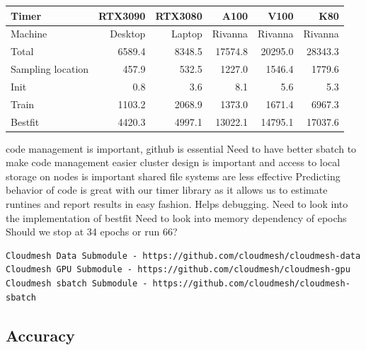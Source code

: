 \documentclass[utf8]{FrontiersinVancouver} %
\newcommand{\TODO}[1]{\todo[inline]{#1}}
\begin{document}
  \begin{table}[htb]
    \caption{Runtime of the 2 epoch case in seconds}
    {\footnotesize              
      \begin{center}
        \begin{table}[]
          \begin{tabular}{lrrrrr}
            Timer             & RTX3090 & RTX3080 & A100    & V100    & K80     \\
            \hline
            Machine           & Desktop & Laptop  & Rivanna & Rivanna & Rivanna \\
            Total             & 6589.4  & 8348.5  & 17574.8 & 20295.0 & 28343.3 \\
            Sampling location &  457.9  &  532.5  &  1227.0 &  1546.4 &  1779.6 \\
            Init              &    0.8  &    3.6  &    8.1  &     5.6 &     5.3 \\
            Train             & 1103.2  & 2068.9  &  1373.0 &  1671.4 &  6967.3 \\
            Bestfit           & 4420.3  & 4997.1  & 13022.1 & 14795.1 & 17037.6 \\
            \hline
          \end{tabular}
        \end{table}
        \end{center} 
    }
\end{table}

code management is important, github is essential
Need to have better sbatch to make code management easier
cluster design is important and access to local storage on nodes is important
shared file systems are less effective 
Predicting behavior of code is great with our timer library as it allows us to estimate runtines and report results in easy fashion. Helps debugging.
Need to look into the implementation of bestfit 
Need to look into memory dependency of epochs
Should we stop at 34 epochs or run 66?

\TODO{add k80 elsewher}

{\footnotesize
\begin{verbatim}
Cloudmesh Data Submodule - https://github.com/cloudmesh/cloudmesh-data
Cloudmesh GPU Submodule - https://github.com/cloudmesh/cloudmesh-gpu
Cloudmesh sbatch Submodule - https://github.com/cloudmesh/cloudmesh-sbatch 
\end{verbatim}
}

\subsection{Accuracy}
\label{sec:perf-accuracy}
\end{document}

